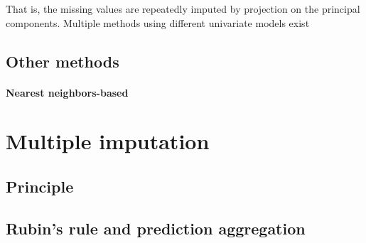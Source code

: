 That is, the missing values are repeatedly imputed by projection on the principal components. Multiple methods using different univariate models exist \cite{MICE_founding}\cite{stekhoven2015missforest}\cite{van2007multiple}	
		
		\subsection{Other methods}
			\paragraph{Nearest neighbors-based}

	\section{Multiple imputation}
		\subsection{Principle}
		\subsection{Rubin's rule and prediction aggregation}